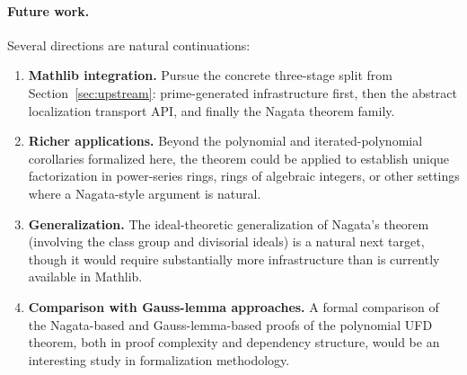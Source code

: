 \documentclass[11pt]{article}
\theoremstyle{plain}
\theoremstyle{definition}
\theoremstyle{remark}
\begin{document}
\paragraph{Future work.}
Several directions are natural continuations:
\begin{enumerate}[nosep]
\item \textbf{Mathlib integration.}  Pursue the concrete three-stage split from
  Section~\ref{sec:upstream}: prime-generated infrastructure first, then the
  abstract localization transport API, and finally the Nagata theorem family.
  \item \textbf{Richer applications.}  Beyond the polynomial and iterated-polynomial
  corollaries formalized here, the theorem could be applied to establish unique
  factorization in power-series rings, rings of algebraic integers, or other
  settings where a Nagata-style argument is natural.
\item \textbf{Generalization.}  The ideal-theoretic generalization of Nagata's
  theorem (involving the class group and divisorial ideals) is a natural next
  target, though it would require substantially more infrastructure than is
  currently available in Mathlib.
\item \textbf{Comparison with Gauss-lemma approaches.}  A formal comparison of
  the Nagata-based and Gauss-lemma-based proofs of the polynomial UFD theorem,
  both in proof complexity and dependency structure, would be an interesting
  study in formalization methodology.
\end{enumerate}


\end{document}
